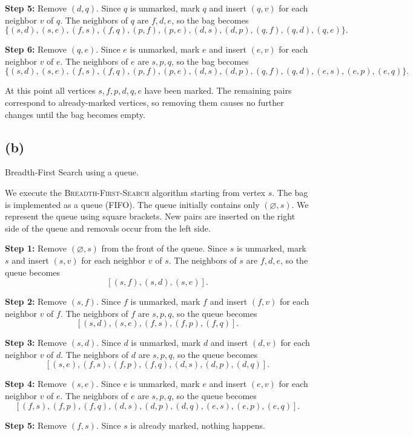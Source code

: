 \documentclass{brockcosc3p03}
\begin{document}
\textbf{Step 5:} Remove $(d,q)$. Since $q$ is unmarked, mark $q$ and insert
$(q,v)$ for each neighbor $v$ of $q$.
The neighbors of $q$ are $f,d,e$, so the bag becomes
\[
\{(s,d),(s,e),(f,s),(f,q),(p,f),(p,e),(d,s),(d,p),(q,f),(q,d),(q,e)\}.
\]

\textbf{Step 6:} Remove $(q,e)$. Since $e$ is unmarked, mark $e$ and insert
$(e,v)$ for each neighbor $v$ of $e$.
The neighbors of $e$ are $s,p,q$, so the bag becomes
\[
\{(s,d),(s,e),(f,s),(f,q),(p,f),(p,e),(d,s),(d,p),(q,f),(q,d),(e,s),(e,p),(e,q)\}.
\]

At this point all vertices $s,f,p,d,q,e$ have been marked. The remaining
pairs correspond to already-marked vertices, so removing them causes no
further changes until the bag becomes empty.

\subsection*{(b)}
Breadth-First Search using a queue.

We execute the \textsc{Breadth-First-Search} algorithm starting from vertex $s$.
The bag is implemented as a queue (FIFO). The queue initially contains only $(\varnothing,s)$.
We represent the queue using square brackets. New pairs are inserted on the right side of the queue and removals occur from the left side.

\textbf{Step 1:} Remove $(\varnothing,s)$ from the front of the queue. Since $s$ is unmarked,
mark $s$ and insert $(s,v)$ for each neighbor $v$ of $s$.
The neighbors of $s$ are $f,d,e$, so the queue becomes
\[
[(s,f),(s,d),(s,e)].
\]

\textbf{Step 2:} Remove $(s,f)$. Since $f$ is unmarked, mark $f$ and insert
$(f,v)$ for each neighbor $v$ of $f$.
The neighbors of $f$ are $s,p,q$, so the queue becomes
\[
[(s,d),(s,e),(f,s),(f,p),(f,q)].
\]

\textbf{Step 3:} Remove $(s,d)$. Since $d$ is unmarked, mark $d$ and insert
$(d,v)$ for each neighbor $v$ of $d$.
The neighbors of $d$ are $s,p,q$, so the queue becomes
\[
[(s,e),(f,s),(f,p),(f,q),(d,s),(d,p),(d,q)].
\]

\textbf{Step 4:} Remove $(s,e)$. Since $e$ is unmarked, mark $e$ and insert
$(e,v)$ for each neighbor $v$ of $e$.
The neighbors of $e$ are $s,p,q$, so the queue becomes
\[
[(f,s),(f,p),(f,q),(d,s),(d,p),(d,q),(e,s),(e,p),(e,q)].
\]

\textbf{Step 5:} Remove $(f,s)$. Since $s$ is already marked, nothing happens.
\end{document}
